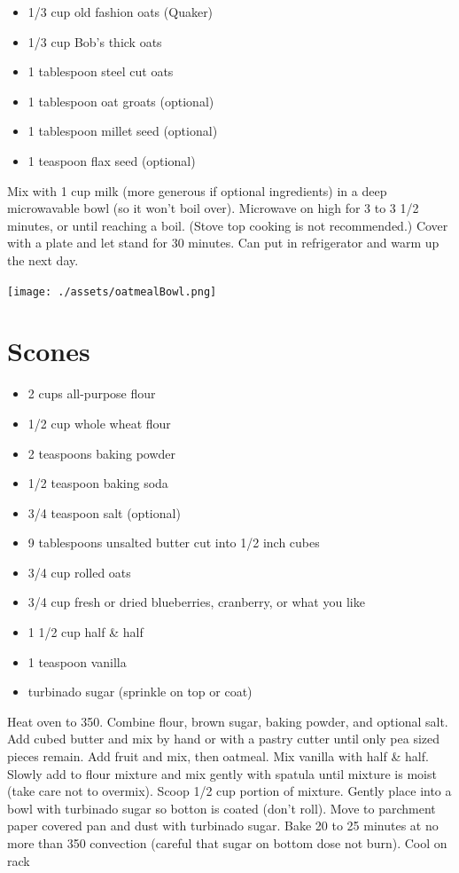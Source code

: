 \documentclass[
  letterpaper,
  DIV=11,
  numbers=noendperiod]{scrreprt}
\providecommand{\tightlist}{%
  \setlength{\itemsep}{0pt}\setlength{\parskip}{0pt}}\usepackage{longtable,booktabs,array}
\begin{document}

\begin{itemize}
\tightlist
\item
  1/3 cup old fashion oats (Quaker)
\item
  1/3 cup Bob's thick oats
\item
  1 tablespoon steel cut oats
\item
  1 tablespoon oat groats (optional)
\item
  1 tablespoon millet seed (optional)
\item
  1 teaspoon flax seed (optional)
\end{itemize}

Mix with 1 cup milk (more generous if optional ingredients) in a deep
microwavable bowl (so it won't boil over). Microwave on high for 3 to 3
1/2 minutes, or until reaching a boil. (Stove top cooking is not
recommended.) Cover with a plate and let stand for 30 minutes. Can put
in refrigerator and warm up the next day.

\texttt{[image: ./assets/oatmealBowl.png]}

\hypertarget{scones}{%
\section*{Scones}\label{scones}}


\begin{itemize}
\tightlist
\item
  2 cups all-purpose flour
\item
  1/2 cup whole wheat flour
\item
  2 teaspoons baking powder
\item
  1/2 teaspoon baking soda
\item
  3/4 teaspoon salt (optional)
\item
  9 tablespoons unsalted butter cut into 1/2 inch cubes
\item
  3/4 cup rolled oats
\item
  3/4 cup fresh or dried blueberries, cranberry, or what you like
\item
  1 1/2 cup half \& half
\item
  1 teaspoon vanilla
\item
  turbinado sugar (sprinkle on top or coat)
\end{itemize}

Heat oven to 350. Combine flour, brown sugar, baking powder, and
optional salt. Add cubed butter and mix by hand or with a pastry cutter
until only pea sized pieces remain. Add fruit and mix, then oatmeal. Mix
vanilla with half \& half. Slowly add to flour mixture and mix gently
with spatula until mixture is moist (take care not to overmix). Scoop
1/2 cup portion of mixture. Gently place into a bowl with turbinado
sugar so botton is coated (don't roll). Move to parchment paper covered
pan and dust with turbinado sugar. Bake 20 to 25 minutes at no more than
350 convection (careful that sugar on bottom dose not burn). Cool on
rack
\end{document}
